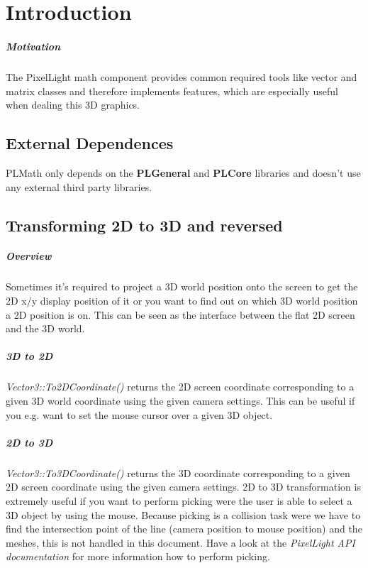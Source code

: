\chapter{Introduction}


\paragraph{Motivation}
The PixelLight math component provides common required tools like vector and matrix classes and therefore implements features, which are especially useful when dealing this 3D graphics.




\section{External Dependences}
PLMath only depends on the \textbf{PLGeneral} and \textbf{PLCore} libraries and doesn't use any external third party libraries.




\section{Transforming 2D to 3D and reversed}


\paragraph{Overview}
Sometimes it's required to project a 3D world position onto the screen to get the 2D x/y display position of it or you want to find out on which 3D world position a 2D position is on. This can be seen as the interface between the flat 2D screen and the 3D world.


\paragraph{3D to 2D}
\emph{Vector3::To2DCoordinate()} returns the 2D screen coordinate corresponding to a given 3D world coordinate using the given camera settings. This can be useful if you e.g. want to set the mouse cursor over a given 3D object.


\paragraph{2D to 3D}
\emph{Vector3::To3DCoordinate()} returns the 3D coordinate corresponding to a given 2D screen coordinate using the given camera settings. 2D to 3D transformation is extremely useful if you want to perform picking were the user is able to select a 3D object by using the mouse. Because picking is a collision task were we have to find the intersection point of the line (camera position to mouse position) and the meshes, this is not handled in this document. Have a look at the \emph{PixelLight API documentation} for more information how to perform picking.





